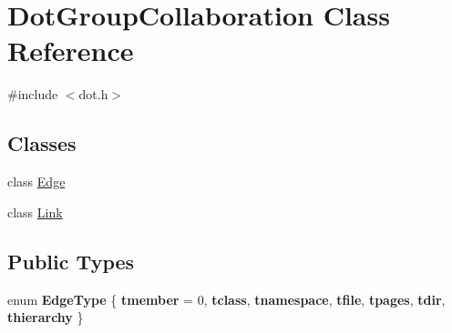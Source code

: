 \hypertarget{class_dot_group_collaboration}{}\section{Dot\+Group\+Collaboration Class Reference}
\label{class_dot_group_collaboration}


{\ttfamily \#include $<$dot.\+h$>$}

\subsection*{Classes}
\begin{DoxyCompactItemize}
\item 
class \mbox{\hyperlink{class_dot_group_collaboration_1_1_edge}{Edge}}
\item 
class \mbox{\hyperlink{class_dot_group_collaboration_1_1_link}{Link}}
\end{DoxyCompactItemize}
\subsection*{Public Types}
\begin{DoxyCompactItemize}
\item 
\mbox{\label{class_dot_group_collaboration_ab83aa11b8617398a50923c04c2541624}} 
enum {\bfseries Edge\+Type} \{ \newline
{\bfseries tmember} = 0, 
{\bfseries tclass}, 
{\bfseries tnamespace}, 
{\bfseries tfile}, 
\newline
{\bfseries tpages}, 
{\bfseries tdir}, 
{\bfseries thierarchy}
 \}
\end{DoxyCompactItemize}
